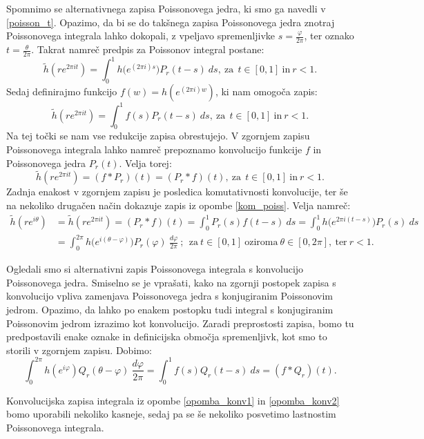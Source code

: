 \documentclass[mat1]{fmfdelo}
\begin{document}
     \begin{opomba}
        \label{opomba_konv1}
        Spomnimo se alternativnega zapisa Poissonovega jedra, ki smo ga navedli v \eqref{poisson_t}. 
        Opazimo, da bi se do takšnega zapisa Poissonovega jedra znotraj Poissonovega integrala lahko dokopali, z vpeljavo spremenljivke $s = \frac{\varphi}{ 2\pi}$, ter oznako $t = \frac{\theta}{2 \pi}$. 
        Takrat namreč predpis za Poissonov integral postane:
        $$
        \widetilde{h}\left(r e^{2 \pi i t}\right) = \int_{0}^{1}{h\big(e^{(2 \pi i)s}\big) P_r(t - s)~ds},~\text{za}~~t \in [0,1]~\text{in}~r < 1. 
        $$
        Sedaj definirajmo funkcijo $f(w) = h(e^{(2 \pi i) w})$, ki nam omogoča zapis:
        $$
        \widetilde{h}\left(r e^{2 \pi i t}\right) = \int_{0}^{1}{f(s) P_r(t - s)~ds},~\text{za}~~t \in [0,1]~\text{in}~r < 1.
        $$
        Na tej točki se nam vse redukcije zapisa obrestujejo. V zgornjem zapisu Poissonovega integrala lahko namreč prepoznamo konvolucijo funkcije $f$ in Poissonovega jedra $P_r(t)$.
        Velja torej:
        \begin{equation}
        \label{konv_Pr}
            \widetilde{h}\left(r e^{2 \pi i t}\right) = (f * P_r)(t) = (P_r * f)(t),~\text{za}~~t \in [0,1]~\text{in}~r < 1.
        \end{equation}
        Zadnja enakost v zgornjem zapisu je posledica komutativnosti konvolucije, ter še na nekoliko drugačen način dokazuje zapis iz opombe \ref{kom_poiss}. Velja namreč:
        \begin{align*}
            \widetilde{h}\left(r e^{i \theta}\right) &= \widetilde{h}\left(r e^{2 \pi i t}\right) = (P_r * f)(t) = \int_{0}^{1}{P_r(s) f(t-s)~ds} = \int_{0}^{1}{h\big(e^{2 \pi i(t - s)}\big) P_r(s)~ds}\\
            & = \int_{0}^{2\pi}{h\big(e^{i(\theta-\varphi)}\big) P_r(\varphi)~\frac{d\varphi}{2 \pi}}~;~~\text{za}~t \in [0,1]~\text{oziroma}~\theta \in [0,2\pi],~\text{ter}~r < 1.
        \end{align*}
     \end{opomba}

     \begin{opomba}
        \label{opomba_konv2}
        Ogledali smo si alternativni zapis Poissonovega integrala s konvolucijo Poissonovega jedra. Smiselno se je vprašati, kako na zgornji postopek zapisa s konvolucijo vpliva zamenjava Poissonovega jedra s konjugiranim Poissonovim jedrom. Opazimo, da lahko po enakem postopku tudi integral s konjugiranim Poissonovim jedrom izrazimo kot konvolucijo. 
        Zaradi preprostosti zapisa, bomo tu predpostavili enake oznake in definicijska območja spremenljivk, kot smo to  storili v zgornjem zapisu. Dobimo: 
        \begin{equation}
            \label{konv_Qr}
            \int_{0}^{2\pi}{h(e^{i\varphi}) Q_r(\theta - \varphi)~\frac{d\varphi}{2 \pi}} = \int_{0}^{1}{f(s) Q_r(t - s)~ds} = (f * Q_r)(t).
        \end{equation}
     \end{opomba}
     Konvolucijska zapisa integrala iz opombe \ref{opomba_konv1} in \ref{opomba_konv2} bomo uporabili nekoliko kasneje, sedaj pa se še nekoliko posvetimo lastnostim Poissonovega integrala.
\end{document}
